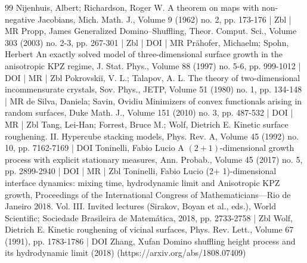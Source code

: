 \begin{thebibliography}{99}
Nijenhuis, Albert; Richardson, Roger W. A theorem on maps with non-negative Jacobians, Mich. Math. J., Volume 9 (1962) no. 2, pp. 173-176 | Zbl | MR
Propp, James Generalized Domino–Shuffling, Theor. Comput. Sci., Volume 303 (2003) no. 2-3, pp. 267-301 | Zbl | DOI | MR
Prähofer, Michaelm; Spohn, Herbert An exactly solved model of three-dimensional surface growth in the anisotropic KPZ regime, J. Stat. Phys., Volume 88 (1997) no. 5-6, pp. 999-1012 | DOI | MR | Zbl
Pokrovskiĭ, V. L.; Talapov, A. L. The theory of two-dimensional incommensurate crystals, Sov. Phys., JETP, Volume 51 (1980) no. 1, pp. 134-148 | MR
de Silva, Daniela; Savin, Ovidiu Minimizers of convex functionals arising in random surfaces, Duke Math. J., Volume 151 (2010) no. 3, pp. 487-532 | DOI | MR | Zbl
Tang, Lei-Han; Forrest, Bruce M.; Wolf, Dietrich E. Kinetic surface roughening. II. Hypercube stacking models, Phys. Rev. A, Volume 45 (1992) no. 10, pp. 7162-7169 | DOI
Toninelli, Fabio Lucio A $(2+1)$-dimensional growth process with explicit stationary measures, Ann. Probab., Volume 45 (2017) no. 5, pp. 2899-2940 | DOI | MR | Zbl
Toninelli, Fabio Lucio (2+ 1)-dimensional interface dynamics: mixing time, hydrodynamic limit and Anisotropic KPZ growth, Proceedings of the International Congress of Mathematicians—Rio de Janeiro 2018. Vol. III. Invited lectures (Sirakov, Boyan et al., eds.), World Scientific; Sociedade Brasileira de Matemática, 2018, pp. 2733-2758 | Zbl
Wolf, Dietrich E. Kinetic roughening of vicinal surfaces, Phys. Rev. Lett., Volume 67 (1991), pp. 1783-1786 | DOI
Zhang, Xufan Domino shuffling height process and its hydrodynamic limit (2018) (https://arxiv.org/abs/1808.07409)
\end{thebibliography}
